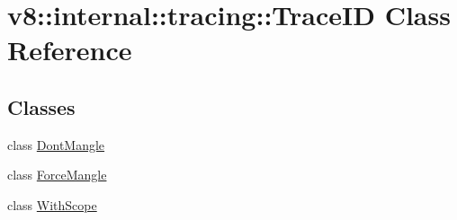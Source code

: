 \hypertarget{classv8_1_1internal_1_1tracing_1_1_trace_i_d}{}\section{v8\+:\+:internal\+:\+:tracing\+:\+:Trace\+ID Class Reference}
\label{classv8_1_1internal_1_1tracing_1_1_trace_i_d}
\subsection*{Classes}
\begin{DoxyCompactItemize}
\item 
class \hyperlink{classv8_1_1internal_1_1tracing_1_1_trace_i_d_1_1_dont_mangle}{Dont\+Mangle}
\item 
class \hyperlink{classv8_1_1internal_1_1tracing_1_1_trace_i_d_1_1_force_mangle}{Force\+Mangle}
\item 
class \hyperlink{classv8_1_1internal_1_1tracing_1_1_trace_i_d_1_1_with_scope}{With\+Scope}
\end{DoxyCompactItemize}
